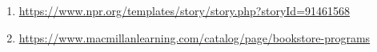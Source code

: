 \documentclass[11pt, oneside,margin=1in]{article}   	%
\newtheorem{remark}{Remark}
\begin{document}
\begin{enumerate}
\item \url{https://www.npr.org/templates/story/story.php?storyId=91461568}
\item \url{https://www.macmillanlearning.com/catalog/page/bookstore-programs}
\end{enumerate}
%
%
%
%
%
%
\end{document}
